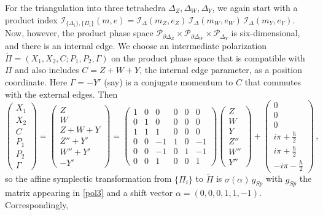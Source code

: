 \documentclass[11pt,letterpaper]{article}
\numberwithin{equation}{section}
\newcommand{\be}{\begin{equation}}
\newcommand{\ee}{\end{equation}}
\newcommand{\wt}{\widetilde}
\newcommand{\Z}{{\mathbb Z}}
\newcommand{\pd}{\partial}
\newcommand{\CI}{\mathcal{I}}
\newcommand{\CP}{\mathcal{P}}
\begin{document}
For the triangulation into three tetrahedra $\Delta_Z,\Delta_W,\Delta_Y$, we again start with a product index $\CI_{\{\Delta_i\},\{\Pi_i\}}(m,e) = \CI_\Delta(m_Z,e_Z)\,\CI_\Delta(m_W,e_W)\,\CI_\Delta(m_Y,e_Y)$. Now, however, the product phase space $\CP_{\pd \Delta_Z}\times \CP_{\pd \Delta_W}\times \CP_{\Delta_Y}$ is six-dimensional, and there is an internal edge. We choose an intermediate polarization $\wt\Pi = (X_1,X_2,C;P_1,P_2,\Gamma)$ on the product phase space that is compatible with $\Pi$ and also includes $C = Z+W+Y$, the internal edge parameter, as a position coordinate. Here $\Gamma = -Y'$ (say) is a conjugate momentum to $C$ that commutes with the external edges. Then
%
\be \begin{pmatrix} X_1\\X_2\\ C\\P_1\\P_2\\\Gamma \end{pmatrix}
= \begin{pmatrix} Z \\ W \\ Z+W+Y \\ Z''+Y' \\ W''+Y' \\ -Y' \end{pmatrix}=
\begin{pmatrix} 1 &0&0&0&0&0 \\ 0&1&0&0&0&0 \\1&1&1&0&0&0 \\ 0&0&-1&1&0&-1 \\ 0&0&-1&0&1&-1 \\ 0&0&1&0&0&1\end{pmatrix}
\begin{pmatrix} Z\\W\\Y\\Z''\\W''\\Y''\end{pmatrix} +
\begin{pmatrix} 0\\0\\0\\i\pi+\tfrac\hbar2\\i\pi+\tfrac\hbar2\\-i\pi-\tfrac\hbar2 \end{pmatrix}\,,
\label{pol3}
\ee
so the affine symplectic transformation from $\{\Pi_i\}$ to $\wt\Pi$ is $\sigma(\alpha)\,g_{Sp}$ with $g_{Sp}$ the matrix appearing in \eqref{pol3} and a shift vector $\alpha = (0,0,0,1,1,-1)$. Correspondingly,
\end{document}
